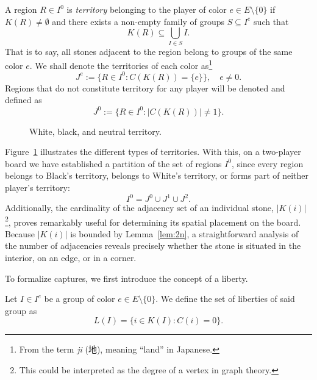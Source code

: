 \begin{definition}[Territory]
	A region $R \in I^0$ is \emph{territory} belonging to the player of color $e \in E \setminus \{0\}$ if $K(R) \neq \emptyset$ and there exists a non-empty family of groups $S \subseteq I^e$ such that
	\[
	K(R) \subseteq \bigcup_{I \in S} I.
	\]
	That is to say, all stones adjacent to the region belong to groups of the same color $e$. We shall denote the territories of each color as\footnote{From the term \textit{ji} (地), meaning ``land'' in Japanese.}
	\[
	J^e := \{ R \in I^0 : C(K(R)) = \{e\} \}, \quad e \neq 0.
	\]
	Regions that do not constitute territory for any player will be denoted and defined as
	\[
	J^0 := \{ R \in I^0 : |C(K(R))| \neq 1 \}.
	\]
\end{definition}
\begin{figure}[H]
	\centering
\begin{goban}[7, hoshi = false]
\end{goban}
	\caption{\textcolor{bg}{White}, \textcolor{Moss}{black}, and \textcolor{terracotta}{neutral} territory.}
	\label{fig:territorios}
\end{figure}
Figure~\ref{fig:territorios} illustrates the different types of territories. With this, on a two-player board we have established a partition of the set of regions $I^0$, since every region belongs to Black's territory, belongs to White's territory, or forms part of neither player's territory:
\[
I^0 = J^0 \cup J^1 \cup J^2.
\]
\label{posicion_espacial}
Additionally, the cardinality of the adjacency set of an individual stone, $|K(i)|$\footnote{This could be interpreted as the degree of a vertex in graph theory.}, proves remarkably useful for determining its spatial placement on the board. Because $|K(i)|$ is bounded by Lemma~\ref{lem:2n}, a straightforward analysis of the number of adjacencies reveals precisely whether the stone is situated in the interior, on an edge, or in a corner.

To formalize captures, we first introduce the concept of a liberty.

\begin{definition}
	Let $I \in I^e$ be a group of color $e \in E \setminus \{0\}$. We define the set of liberties of said group as
	\[
	L(I) = \{ i \in K(I) : C(i) = 0 \}.
	\]
\end{definition}


